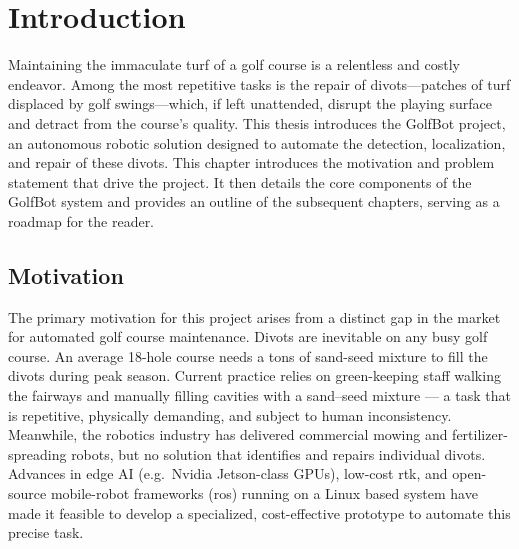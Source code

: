 \chapter{Introduction}
\label{chap:introduction}
Maintaining the immaculate turf of a golf course is a relentless and costly endeavor. Among the most repetitive tasks is the repair of divots—patches of turf displaced by golf swings—which, if left unattended, disrupt the playing surface and detract from the course's quality. This thesis introduces the GolfBot project, an autonomous robotic solution designed to automate the detection, localization, and repair of these divots. This chapter introduces the motivation and problem statement that drive the project. It then details the core components of the GolfBot system and provides an outline of the subsequent chapters, serving as a roadmap for the reader.


\section{Motivation}
\label{sec:motivation}
The primary motivation for this project arises from a distinct gap in the market for automated golf course maintenance. 
Divots are inevitable on any busy golf course.  An average 18-hole course needs a tons of sand-seed mixture to fill the divots during peak season. Current practice relies on green-keeping staff walking the fairways and manually filling cavities with a sand–seed mixture — a task that is repetitive, physically demanding, and subject to human inconsistency.  Meanwhile, the robotics industry has delivered commercial mowing and fertilizer-spreading robots, but no solution that identifies and repairs individual divots.  
Advances in edge AI (e.g.\ Nvidia Jetson-class GPUs), low-cost \gls{rtk}, and open-source mobile-robot frameworks (\gls{ros}) running on a Linux based system have made it feasible to develop a specialized, cost-effective prototype to automate this precise task.  

